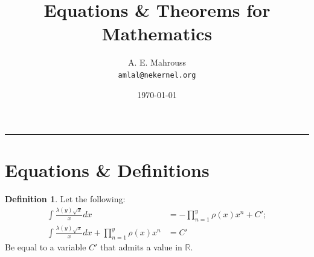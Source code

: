 \documentclass[10pt]{article}
\title{%
  \vspace{-1.5em}%
  \large\textbf{Equations \& Theorems for Mathematics}%
}
\author{A. E. Mahrouss\\\texttt{amlal@nekernel.org}}
\date{\today}
\theoremstyle{plain}
\theoremstyle{definition}
\newtheorem{definition}[theorem]{Definition}
\theoremstyle{remark}
\begin{document}
  \maketitle
\vspace{-0.5em}
\vspace{0.8em}
\rule{\linewidth}{0.4pt}
\vspace{1em}

\section{Equations \& Definitions}

\begin{definition}
	Let the following:
	\begin{align*}
		\int \frac{\lambda(y) \sqrt{x}}{x} dx &= - \prod_{n=1}^{y}\rho(x) x^{n} + C';\\
		\int \frac{\lambda(y) \sqrt{x}}{x} dx + \prod_{n=1}^{y}\rho(x) x^{n} &= C'
	\end{align*}
	Be equal to a variable $C'$ that admits a value in $\mathbb{R}$.
\end{definition}

\nocite{*}



\end{document}
